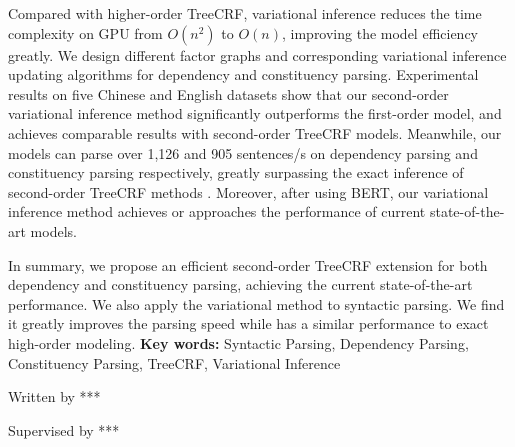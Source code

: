\begin{eabstract}
\begin{enumerate}
		      Compared with higher-order TreeCRF, variational inference reduces the time complexity on GPU from $O(n^2)$ to $O(n)$, improving the model efficiency greatly.
		      We design different factor graphs and corresponding variational inference updating algorithms for dependency and constituency parsing.
		      Experimental results on five Chinese and English datasets show that our second-order variational inference method significantly outperforms the first-order model, and achieves comparable results with second-order TreeCRF models.
		      Meanwhile, our models can parse over 1,126 and 905 sentences/s on dependency parsing and constituency parsing respectively, greatly surpassing the exact inference of second-order TreeCRF methods .
		      Moreover, after using BERT, our variational inference method achieves or approaches the performance of current state-of-the-art models.
	\end{enumerate}
	
	In summary, we propose an efficient second-order TreeCRF extension for both dependency and constituency parsing, achieving the current state-of-the-art performance.
	We also apply the variational method to syntactic parsing.
	We find it greatly improves the parsing speed while has a similar performance to exact high-order modeling.
	\vskip 21bp
	{\bf{} Key words: }
	Syntactic Parsing,
	Dependency Parsing,
	Constituency Parsing,
	TreeCRF,
	Variational Inference
\end{eabstract}

\begin{flushright}
	Written by ***
	
	Supervised by ***
\end{flushright}
